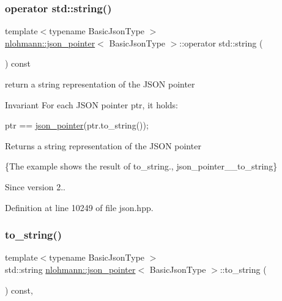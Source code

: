 \subsubsection{\texorpdfstring{operator std\+::string()}{operator std::string()}}
{\footnotesize\ttfamily template$<$typename Basic\+Json\+Type $>$ \\
\hyperlink{classnlohmann_1_1json__pointer}{nlohmann\+::json\+\_\+pointer}$<$ Basic\+Json\+Type $>$\+::operator std\+::string (\begin{DoxyParamCaption}{ }\end{DoxyParamCaption}) const\hspace{0.3cm}{\ttfamily [inline]}}



return a string representation of the J\+S\+ON pointer 

\begin{DoxyInvariant}{Invariant}
For each J\+S\+ON pointer {\ttfamily ptr}, it holds\+: 
\begin{DoxyCode}
ptr == \hyperlink{classnlohmann_1_1json__pointer_a7f32d7c62841f0c4a6784cf741a6e4f8}{json\_pointer}(ptr.to\_string());
\end{DoxyCode}

\end{DoxyInvariant}
\begin{DoxyReturn}{Returns}
a string representation of the J\+S\+ON pointer
\end{DoxyReturn}
\{The example shows the result of {\ttfamily to\+\_\+string}., json\+\_\+pointer\+\_\+\+\_\+to\+\_\+string\}

\begin{DoxySince}{Since}
version 2.. 
\end{DoxySince}


Definition at line 10249 of file json.\+hpp.

\mbox{\label{classnlohmann_1_1json__pointer_ad7d3a3a215db8fe0964e644a918dcccb}} 
\subsubsection{\texorpdfstring{to\+\_\+string()}{to\_string()}}
{\footnotesize\ttfamily template$<$typename Basic\+Json\+Type $>$ \\
std\+::string \hyperlink{classnlohmann_1_1json__pointer}{nlohmann\+::json\+\_\+pointer}$<$ Basic\+Json\+Type $>$\+::to\+\_\+string (\begin{DoxyParamCaption}{ }\end{DoxyParamCaption}) const\hspace{0.3cm}{\ttfamily [inline]}, {\ttfamily [noexcept]}}



